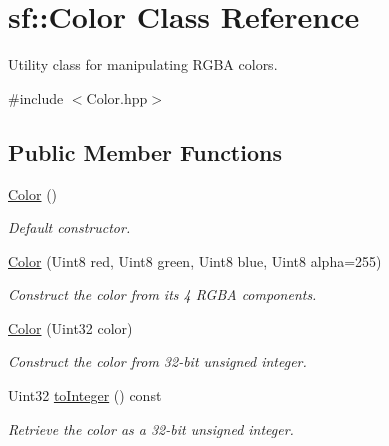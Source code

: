 \hypertarget{classsf_1_1_color}{}\section{sf\+:\+:Color Class Reference}
\label{classsf_1_1_color}


Utility class for manipulating R\+G\+BA colors.  




{\ttfamily \#include $<$Color.\+hpp$>$}

\subsection*{Public Member Functions}
\begin{DoxyCompactItemize}
\item 
\mbox{\hyperlink{classsf_1_1_color_ac2eb4393fb11ad3fa3ccf34e92fe08e4}{Color}} ()
\begin{DoxyCompactList}\small\item\em Default constructor. \end{DoxyCompactList}\item 
\mbox{\hyperlink{classsf_1_1_color_ac791dc61be4c60baac50fe700f1c9850}{Color}} (Uint8 red, Uint8 green, Uint8 blue, Uint8 alpha=255)
\begin{DoxyCompactList}\small\item\em Construct the color from its 4 R\+G\+BA components. \end{DoxyCompactList}\item 
\mbox{\hyperlink{classsf_1_1_color_a5449f4b2b9a78230d40ce2c223c9ab2e}{Color}} (Uint32 color)
\begin{DoxyCompactList}\small\item\em Construct the color from 32-\/bit unsigned integer. \end{DoxyCompactList}\item 
Uint32 \mbox{\hyperlink{classsf_1_1_color_abb46e6942c4fe0d221574a46e642caa9}{to\+Integer}} () const
\begin{DoxyCompactList}\small\item\em Retrieve the color as a 32-\/bit unsigned integer. \end{DoxyCompactList}\end{DoxyCompactItemize}

